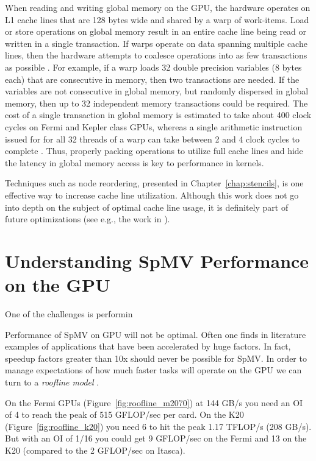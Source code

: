 \documentclass{report}
\begin{document}
When reading and writing global memory on the GPU, the hardware operates on L1 cache lines that are 128 bytes wide and shared by a warp of work-items. Load or store operations on global memory result in an entire cache line being read or written in a single transaction. If warps operate on data spanning multiple cache lines, then the hardware attempts to coalesce operations into as few transactions as possible \cite{CudaGuide2013}. For example, if a warp loads 32 double precision variables (8 bytes each) that are consecutive in memory, then two transactions are needed. If the variables are not consecutive in global memory, but randomly dispersed in global memory, then up to 32 independent memory transactions could be required. The cost of a single transaction in global memory is estimated to take about 400 clock cycles on Fermi and Kepler class GPUs, whereas a single arithmetic instruction issued for for all 32 threads of a warp can take between 2 and 4 clock cycles to complete \cite{CudaGuide2013}. Thus, properly packing operations to utilize full cache lines and hide the latency in global memory access is key to performance in kernels. 

Techniques such as node reordering, presented in Chapter~\ref{chap:stencils}, is one effective way to increase cache line utilization. Although this work does not go into depth on the subject of optimal cache line usage, it is definitely part of future optimizations (see e.g., the work in \cite{ErlebacherSauleFlyerBollig2013}). 



\section{Understanding SpMV Performance on the GPU}

One of the challenges is performin

Performance of SpMV on GPU will not be optimal. Often one finds in literature examples of applications that have been accelerated by huge factors. In fact, speedup factors greater than 10x should never be possible for SpMV. In order to manage expectations of how much faster tasks will operate on the GPU we can turn to a \emph{roofline model} \cite{Williams2009}.

On the Fermi GPUs (Figure~\ref{fig:roofline_m2070}) at 144 GB/s you need an OI of 4 to reach the peak of 515 GFLOP/sec per card. On the K20 (Figure~\ref{fig:roofline_k20}) you need 6 to hit the peak 1.17 TFLOP/s (208 GB/s). But with an OI of 1/16 you could get 9 GFLOP/sec on the Fermi and 13 on the K20 (compared to the 2 GFLOP/sec on Itasca). 
\end{document}
